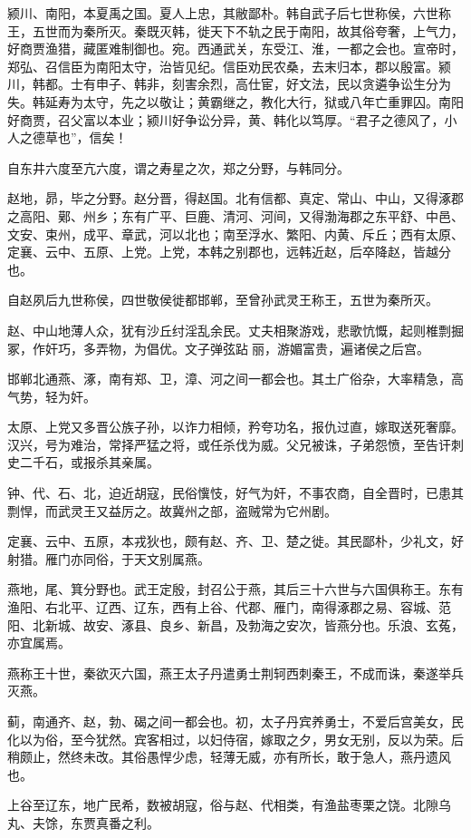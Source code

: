 \documentclass[]{article}
\begin{document}
颍川、南阳，本夏禹之国。夏人上忠，其敝鄙朴。韩自武子后七世称侯，六世称王，五世而为秦所灭。秦既灭韩，徙天下不轨之民于南阳，故其俗夸奢，上气力，好商贾渔猎，藏匿难制御也。宛。西通武关，东受江、淮，一都之会也。宣帝时，郑弘、召信臣为南阳太守，治皆见纪。信臣劝民农桑，去末归本，郡以殷富。颍川，韩都。士有申子、韩非，刻害余烈，高仕宦，好文法，民以贪遴争讼生分为失。韩延寿为太守，先之以敬让；黄霸继之，教化大行，狱或八年亡重罪囚。南阳好商贾，召父富以本业；颍川好争讼分异，黄、韩化以笃厚。``君子之德风了，小人之德草也''，信矣！

自东井六度至亢六度，谓之寿星之次，郑之分野，与韩同分。

赵地，昴，毕之分野。赵分晋，得赵国。北有信都、真定、常山、中山，又得涿郡之高阳、鄚、州乡；东有广平、巨鹿、清河、河间，又得渤海郡之东平舒、中邑、文安、束州，成平、章武，河以北也；南至浮水、繁阳、内黄、斥丘；西有太原、定襄、云中、五原、上党。上党，本韩之别郡也，远韩近赵，后卒降赵，皆越分也。

自赵夙后九世称侯，四世敬侯徙都邯郸，至曾孙武灵王称王，五世为秦所灭。

赵、中山地薄人众，犹有沙丘纣淫乱余民。丈夫相聚游戏，悲歌忼慨，起则椎剽掘冢，作奸巧，多弄物，为倡优。文子弹弦跕丽，游媚富贵，遍诸侯之后宫。

邯郸北通燕、涿，南有郑、卫，漳、河之间一都会也。其土广俗杂，大率精急，高气势，轻为奸。

太原、上党又多晋公族子孙，以诈力相倾，矜夸功名，报仇过直，嫁取送死奢靡。汉兴，号为难治，常择严猛之将，或任杀伐为威。父兄被诛，子弟怨愤，至告讦刺史二千石，或报杀其亲属。

钟、代、石、北，迫近胡寇，民俗懻忮，好气为奸，不事农商，自全晋时，已患其剽悍，而武灵王又益厉之。故冀州之部，盗贼常为它州剧。

定襄、云中、五原，本戎狄也，颇有赵、齐、卫、楚之徙。其民鄙朴，少礼文，好射猎。雁门亦同俗，于天文别属燕。

燕地，尾、箕分野也。武王定殷，封召公于燕，其后三十六世与六国俱称王。东有渔阳、右北平、辽西、辽东，西有上谷、代郡、雁门，南得涿郡之易、容城、范阳、北新城、故安、涿县、良乡、新昌，及勃海之安次，皆燕分也。乐浪、玄菟，亦宜属焉。

燕称王十世，秦欲灭六国，燕王太子丹遣勇士荆轲西刺秦王，不成而诛，秦遂举兵灭燕。

蓟，南通齐、赵，勃、碣之间一都会也。初，太子丹宾养勇士，不爱后宫美女，民化以为俗，至今犹然。宾客相过，以妇侍宿，嫁取之夕，男女无别，反以为荣。后稍颇止，然终未改。其俗愚悍少虑，轻薄无威，亦有所长，敢于急人，燕丹遗风也。

上谷至辽东，地广民希，数被胡寇，俗与赵、代相类，有渔盐枣栗之饶。北隙乌丸、夫馀，东贾真番之利。
\end{document}
